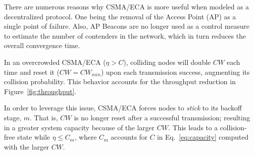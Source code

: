 There are numerous reasons why CSMA/ECA is more useful when modeled as a decentralized protocol. One being the removal of the Access Point (AP) as a single point of failure. Also, AP Beacons are no longer used as a control measure to estimate the number of contenders in the network, which in turn reduces the overall convergence time.


In an overcrowded CSMA/ECA ($\eta>C$), colliding nodes will double $CW$ each time and reset it ($CW=CW_{min}$) upon each transmission success, augmenting its collision probability. This behavior accounts for the throughput reduction in Figure~\ref{fig:throughput}.

In order to leverage this issue, CSMA/ECA forces nodes to \emph{stick} to its backoff stage, $m$. That is, $CW$ is no longer reset after a successful transmission; resulting in a greater system capacity because of the larger $CW$. This leads to a collision-free state while $\eta\leq C_{m}$, where $C_{m}$ accounts for $C$ in Eq.~\ref{eq:capacity} computed with the larger $CW$.




